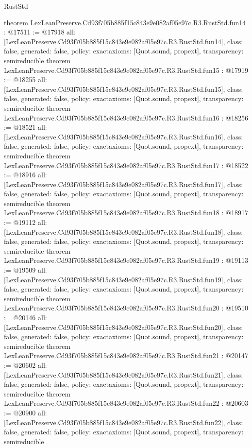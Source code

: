 \begin{lexlean}{RustStd}
\begin{coremodule}
{}
theorem LexLeanPreserve.Cd93f705b885f15c843e9e082af05e97c.R3.RustStd.fun14 : @17511 := @17918 {
  all: [LexLeanPreserve.Cd93f705b885f15c843e9e082af05e97c.R3.RustStd.fun14],
  class: false,
  generated: false,
  policy: exact{axioms: [Quot.sound, propext]},
  transparency: semireducible
}
theorem LexLeanPreserve.Cd93f705b885f15c843e9e082af05e97c.R3.RustStd.fun15 : @17919 := @18255 {
  all: [LexLeanPreserve.Cd93f705b885f15c843e9e082af05e97c.R3.RustStd.fun15],
  class: false,
  generated: false,
  policy: exact{axioms: [Quot.sound, propext]},
  transparency: semireducible
}
theorem LexLeanPreserve.Cd93f705b885f15c843e9e082af05e97c.R3.RustStd.fun16 : @18256 := @18521 {
  all: [LexLeanPreserve.Cd93f705b885f15c843e9e082af05e97c.R3.RustStd.fun16],
  class: false,
  generated: false,
  policy: exact{axioms: [Quot.sound, propext]},
  transparency: semireducible
}
theorem LexLeanPreserve.Cd93f705b885f15c843e9e082af05e97c.R3.RustStd.fun17 : @18522 := @18916 {
  all: [LexLeanPreserve.Cd93f705b885f15c843e9e082af05e97c.R3.RustStd.fun17],
  class: false,
  generated: false,
  policy: exact{axioms: [Quot.sound, propext]},
  transparency: semireducible
}
theorem LexLeanPreserve.Cd93f705b885f15c843e9e082af05e97c.R3.RustStd.fun18 : @18917 := @19112 {
  all: [LexLeanPreserve.Cd93f705b885f15c843e9e082af05e97c.R3.RustStd.fun18],
  class: false,
  generated: false,
  policy: exact{axioms: [Quot.sound, propext]},
  transparency: semireducible
}
theorem LexLeanPreserve.Cd93f705b885f15c843e9e082af05e97c.R3.RustStd.fun19 : @19113 := @19509 {
  all: [LexLeanPreserve.Cd93f705b885f15c843e9e082af05e97c.R3.RustStd.fun19],
  class: false,
  generated: false,
  policy: exact{axioms: [Quot.sound, propext]},
  transparency: semireducible
}
theorem LexLeanPreserve.Cd93f705b885f15c843e9e082af05e97c.R3.RustStd.fun20 : @19510 := @20146 {
  all: [LexLeanPreserve.Cd93f705b885f15c843e9e082af05e97c.R3.RustStd.fun20],
  class: false,
  generated: false,
  policy: exact{axioms: [Quot.sound, propext]},
  transparency: semireducible
}
theorem LexLeanPreserve.Cd93f705b885f15c843e9e082af05e97c.R3.RustStd.fun21 : @20147 := @20602 {
  all: [LexLeanPreserve.Cd93f705b885f15c843e9e082af05e97c.R3.RustStd.fun21],
  class: false,
  generated: false,
  policy: exact{axioms: [Quot.sound, propext]},
  transparency: semireducible
}
theorem LexLeanPreserve.Cd93f705b885f15c843e9e082af05e97c.R3.RustStd.fun22 : @20603 := @20900 {
  all: [LexLeanPreserve.Cd93f705b885f15c843e9e082af05e97c.R3.RustStd.fun22],
  class: false,
  generated: false,
  policy: exact{axioms: [Quot.sound, propext]},
  transparency: semireducible
}
\end{coremodule}
\end{lexlean}
